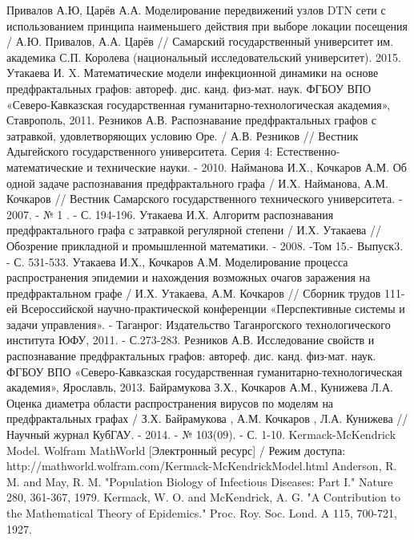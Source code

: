 \begin{thebibliography}{}
	 Привалов А.Ю, Царёв А.А. Моделирование передвижений узлов DTN сети с использованием принципа наименьшего действия при выборе локации посещения / А.Ю. Привалов, А.А. Царёв // Самарский государственный университет им. академика С.П. Королева (национальный исследовательский университет). 2015.
	Утакаева И. X. Математические модели	инфекционной динамики	на основе	предфрактальных графов: автореф. дис.  канд. физ-мат. наук.  ФГБОУ ВПО «Северо-Кавказская	государственная гуманитарно-технологическая академия», Ставрополь, 2011.
	Резников А.В. Распознавание предфрактальных графов с затравкой, удовлетворяющих условию Оре. / А.В. Резников // Вестник Адыгейского государственного университета. Серия 4: Естественно-математические и технические науки. - 2010.
	  Найманова И.Х., Кочкаров А.М. Об одной задаче распознавания предфрактального графа / И.Х. Найманова, А.М. Кочкаров // Вестник Самарского государственного технического университета. - 2007. - № 1 . - С. 194-196.
	Утакаева И.Х. Алгоритм распознавания предфрактального графа с затравкой регулярной степени / И.Х. Утакаева // Обозрение прикладной и промышленной математики. - 2008. -Том 15.- Выпуск3. - С. 531-533.
	Утакаева И.Х., Кочкаров А.М. Моделирование процесса распространения эпидемии и нахождения возможных очагов заражения на предфрактальном графе / И.Х. Утакаева, А.М. Кочкаров // Сборник трудов 111-ей Всероссийской научно-практической конференции «Перспективные системы и задачи управления». - Таганрог: Издательство Таганрогского технологического института ЮФУ, 2011. - С.273-283. 
	 Резников А.В. Исследование свойств и распознавание предфрактальных графов: автореф. дис.  канд. физ-мат. наук.  ФГБОУ ВПО «Северо-Кавказская	государственная гуманитарно-технологическая академия», Ярославль, 2013.
	 Байрамукова З.Х.,	Кочкаров А.М.,	Кунижева Л.А. Оценка диаметра области распространения вирусов по моделям на предфрактальных графах /   З.Х. Байрамукова ,	А.М. Кочкаров , Л.А. Кунижева //	Научный журнал КубГАУ. - 2014. - № 103(09). - С. 1-10.
	 Kermack-McKendrick Model. Wolfram MathWorld [Электронный ресурс] / Режим доступа: http://mathworld.wolfram.com/Kermack-McKendrickModel.html
	 Anderson, R. M. and May, R. M. "Population Biology of Infectious Diseases: Part I." Nature 280, 361-367, 1979.
	 Kermack, W. O. and McKendrick, A. G. "A Contribution to the Mathematical Theory of Epidemics." Proc. Roy. Soc. Lond. A 115, 700-721, 1927.

\end{thebibliography}
